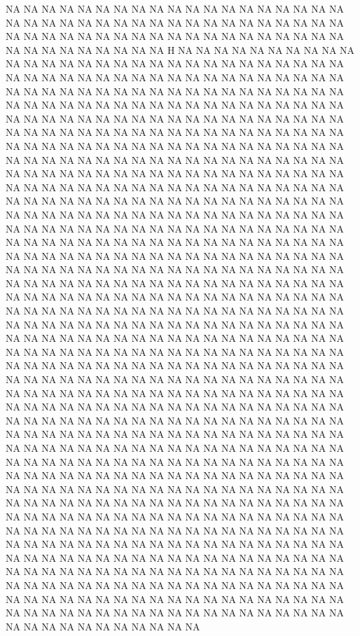{NA
NA
NA
NA
NA
NA
NA
NA
NA
NA
NA
NA
NA
NA
NA
NA
NA
NA
NA
NA
NA
NA
NA
NA
NA
NA
NA
NA
NA
NA
NA
NA
NA
NA
NA
NA
NA
NA
NA
NA
NA
NA
NA
NA
NA
NA
NA
NA
NA
NA
NA
NA
NA
NA
NA
NA
NA
NA
NA
NA
NA
NA
NA
NA
NA
NA
H
NA
NA
NA
NA
NA
NA
NA
NA
NA
NA
NA
NA
NA
NA
NA
NA
NA
NA
NA
NA
NA
NA
NA
NA
NA
NA
NA
NA
NA
NA
NA
NA
NA
NA
NA
NA
NA
NA
NA
NA
NA
NA
NA
NA
NA
NA
NA
NA
NA
NA
NA
NA
NA
NA
NA
NA
NA
NA
NA
NA
NA
NA
NA
NA
NA
NA
NA
NA
NA
NA
NA
NA
NA
NA
NA
NA
NA
NA
NA
NA
NA
NA
NA
NA
NA
NA
NA
NA
NA
NA
NA
NA
NA
NA
NA
NA
NA
NA
NA
NA
NA
NA
NA
NA
NA
NA
NA
NA
NA
NA
NA
NA
NA
NA
NA
NA
NA
NA
NA
NA
NA
NA
NA
NA
NA
NA
NA
NA
NA
NA
NA
NA
NA
NA
NA
NA
NA
NA
NA
NA
NA
NA
NA
NA
NA
NA
NA
NA
NA
NA
NA
NA
NA
NA
NA
NA
NA
NA
NA
NA
NA
NA
NA
NA
NA
NA
NA
NA
NA
NA
NA
NA
NA
NA
NA
NA
NA
NA
NA
NA
NA
NA
NA
NA
NA
NA
NA
NA
NA
NA
NA
NA
NA
NA
NA
NA
NA
NA
NA
NA
NA
NA
NA
NA
NA
NA
NA
NA
NA
NA
NA
NA
NA
NA
NA
NA
NA
NA
NA
NA
NA
NA
NA
NA
NA
NA
NA
NA
NA
NA
NA
NA
NA
NA
NA
NA
NA
NA
NA
NA
NA
NA
NA
NA
NA
NA
NA
NA
NA
NA
NA
NA
NA
NA
NA
NA
NA
NA
NA
NA
NA
NA
NA
NA
NA
NA
NA
NA
NA
NA
NA
NA
NA
NA
NA
NA
NA
NA
NA
NA
NA
NA
NA
NA
NA
NA
NA
NA
NA
NA
NA
NA
NA
NA
NA
NA
NA
NA
NA
NA
NA
NA
NA
NA
NA
NA
NA
NA
NA
NA
NA
NA
NA
NA
NA
NA
NA
NA
NA
NA
NA
NA
NA
NA
NA
NA
NA
NA
NA
NA
NA
NA
NA
NA
NA
NA
NA
NA
NA
NA
NA
NA
NA
NA
NA
NA
NA
NA
NA
NA
NA
NA
NA
NA
NA
NA
NA
NA
NA
NA
NA
NA
NA
NA
NA
NA
NA
NA
NA
NA
NA
NA
NA
NA
NA
NA
NA
NA
NA
NA
NA
NA
NA
NA
NA
NA
NA
NA
NA
NA
NA
NA
NA
NA
NA
NA
NA
NA
NA
NA
NA
NA
NA
NA
NA
NA
NA
NA
NA
NA
NA
NA
NA
NA
NA
NA
NA
NA
NA
NA
NA
NA
NA
NA
NA
NA
NA
NA
NA
NA
NA
NA
NA
NA
NA
NA
NA
NA
NA
NA
NA
NA
NA
NA
NA
NA
NA
NA
NA
NA
NA
NA
NA
NA
NA
NA
NA
NA
NA
NA
NA
NA
NA
NA
NA
NA
NA
NA
NA
NA
NA
NA
NA
NA
NA
NA
NA
NA
NA
NA
NA
NA
NA
NA
NA
NA
NA
NA
NA
NA
NA
NA
NA
NA
NA
NA
NA
NA
NA
NA
NA
NA
NA
NA
NA
NA
NA
NA
NA
NA
NA
NA
NA
NA
NA
NA
NA
NA
NA
NA
NA
NA
NA
NA
NA
NA
NA
NA
NA
NA
NA
NA
NA
NA
NA
NA
NA
NA
NA
NA
NA
NA
NA
NA
NA
NA
NA
NA
NA
NA
NA
NA
NA
NA
NA
NA
NA
NA
NA
NA
NA
NA
NA
NA
NA
NA
NA
NA
NA
NA
NA
NA
NA
NA
NA
NA
NA
NA
NA
NA
NA
NA
NA
NA
NA
NA
NA
NA
NA
NA
NA
NA
NA
NA
NA
NA
NA
NA
NA
NA
NA
NA
NA
NA
NA
NA
NA
NA
NA
NA
NA
NA
NA
NA
NA
NA
NA
NA
NA
NA
NA
NA
NA
NA
NA
NA
NA
NA
NA
NA
NA
NA
NA
NA
NA
NA
NA
NA
NA
NA
NA
NA
NA
NA
NA
NA
NA
NA
NA
NA
NA
NA
NA
NA
NA
NA
NA
NA
NA
NA
NA
NA
NA
NA
NA
NA
NA
NA
NA
NA
NA
NA
NA
NA
NA
NA
NA
NA
NA
NA
NA
NA
NA
NA
NA
NA
NA
NA
NA
NA
NA
NA
NA
NA
NA
NA
NA
NA
NA
NA
NA
NA
NA
NA
NA
NA
NA
NA
NA
NA
NA
NA
NA
NA
NA
NA
NA
NA
NA
NA
NA
NA
NA
NA
NA
NA
NA
NA
NA
NA
NA
NA
NA
NA
NA
NA
NA
NA
NA
NA
NA
NA
NA
NA
NA
NA
NA
NA
NA
NA
NA
NA
NA
NA
NA
NA
NA
NA
NA
NA
NA
NA
NA
NA
NA
NA
NA
NA
NA
NA
NA
NA
NA
NA
NA
NA
NA
NA
NA
NA
NA
NA
NA
NA
NA
NA
NA
NA
NA
NA
NA
NA
NA
NA
NA
NA
NA
NA
NA
NA
}
